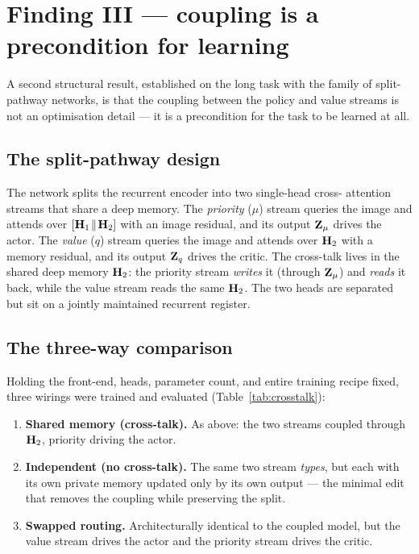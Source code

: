 \chapter{Finding III --- coupling is a precondition for learning}
\label{ch:crosstalk}

A second structural result, established on the long task with the  family of
split-pathway networks, is that the coupling between the policy and value streams is not an
optimisation detail --- it is a precondition for the task to be learned at all.

\section{The split-pathway design}
The  network splits the recurrent encoder into two single-head cross-
attention streams that share a deep memory. The \emph{priority} ($\mu$) stream queries the
image and attends over $[\mathbf{H}_1\!\parallel\!\mathbf{H}_2]$ with an image residual, and its output
$\mathbf{Z}_\mu$ drives the actor. The \emph{value} ($q$) stream queries the image and attends over
$\mathbf{H}_2$ with a memory residual, and its output $\mathbf{Z}_q$ drives the critic. The cross-talk
lives in the shared deep memory $\mathbf{H}_2$: the priority stream \emph{writes} it (through
$\mathbf{Z}_\mu$) and \emph{reads} it back, while the value stream reads the same $\mathbf{H}_2$. The two
heads are separated but sit on a jointly maintained recurrent register.

\section{The three-way comparison}
Holding the front-end, heads, parameter count, and entire training recipe fixed, three
wirings were trained and evaluated (Table~\ref{tab:crosstalk}):
\begin{enumerate}
\item \textbf{Shared memory (cross-talk).} As above: the two streams coupled through
$\mathbf{H}_2$, priority driving the actor.
\item \textbf{Independent (no cross-talk).} The same two stream \emph{types}, but each with
its own private memory updated only by its own output --- the minimal edit that removes the
coupling while preserving the split.
\item \textbf{Swapped routing.} Architecturally identical to the coupled model, but the
value stream drives the actor and the priority stream drives the critic.
\end{enumerate}

